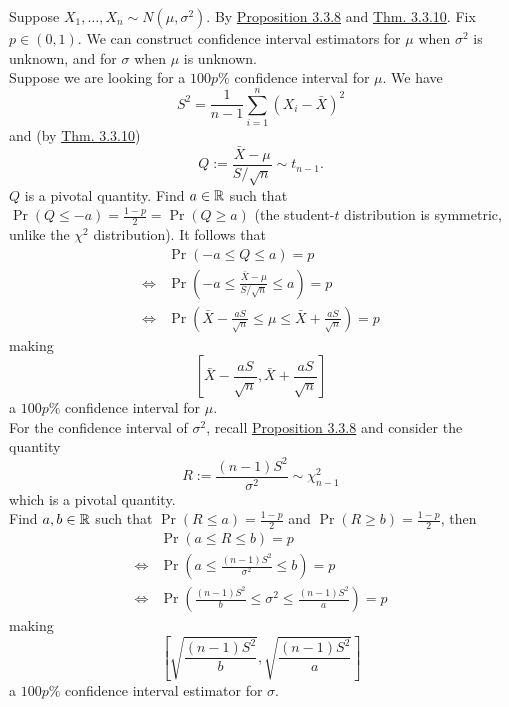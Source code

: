 \documentclass[11pt,fleqn]{book} %
\begin{document}
\begin{example} \label{eg:578}
Suppose \(X_1, \ldots, X_n \sim N(\mu, \sigma^2)\). By \hyperref[prop:338]{Proposition 3.3.8} and \hyperref[thm:3310]{Thm. 3.3.10}. Fix \(p \in (0, 1)\). We can construct confidence interval estimators for \(\mu\) when \(\sigma^2\) is unknown, and for \(\sigma\) when \(\mu\) is unknown. \\
\indent Suppose we are looking for a \(100p\%\) confidence interval for \(\mu\). We have
\[
S^2 = \frac1{n-1} \sum_{i=1}^n(X_i - \bar{X})^2
\]
and (by \hyperref[thm:3310]{Thm. 3.3.10})
\[
Q := \frac{\bar{X} - \mu}{S / \sqrt{n}} \sim t_{n-1}.
\]
\indent \(Q\) is a pivotal quantity. Find \(a \in \mathbb{R}\) such that \(\Pr(Q \leq -a) = \frac{1 - p}{2} = \Pr(Q \geq a)\) (the student-\(t\) distribution is symmetric, unlike the \(\chi^2\) distribution). It follows that
\[
\begin{aligned}
&\Pr(-a \leq Q \leq a) = p \\
\Leftrightarrow &\Pr\left(-a \leq \frac{\bar{X} - \mu}{S / \sqrt{n}} \leq a\right) = p \\
\Leftrightarrow &\Pr\left(\bar{X} - \frac{aS}{\sqrt{n}} \leq \mu \leq \bar{X} + \frac{aS}{\sqrt{n}}\right) = p
\end{aligned}
\]
making
\[
\left[\bar{X} - \frac{aS}{\sqrt n}, \bar{X} + \frac{aS}{\sqrt n}\right]
\]
a \(100p\%\) confidence interval for \(\mu\). \\
\indent For the confidence interval of \(\sigma^2\), recall \hyperref[prop:338]{Proposition 3.3.8} and consider the quantity
\[
R := \frac{(n - 1)S^2}{\sigma^2} \sim \chi^2_{n - 1}
\]
which is a pivotal quantity. \\
\indent Find \(a, b \in \mathbb{R}\) such that \(\Pr(R \leq a) = \frac{1 - p}{2}\) and \(\Pr(R \geq b) = \frac{1 - p}{2}\), then
\[
\begin{aligned}
&\Pr(a \leq R \leq b) = p \\
\Leftrightarrow &\Pr\left(a \leq \frac{(n - 1)S^2}{\sigma^2} \leq b\right) = p \\
\Leftrightarrow &\Pr\left(\frac{(n - 1)S^2}{b} \leq \sigma^2 \leq \frac{(n - 1)S^2}{a}\right) = p
\end{aligned}
\]
making
\[
\left[\sqrt{\frac{(n - 1)S^2}{b}}, \sqrt{\frac{(n - 1)S^2}{a}}\right]
\]
a \(100p\%\) confidence interval estimator for \(\sigma\).
\end{example}
\end{document}

